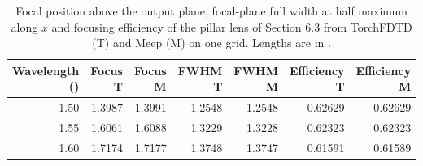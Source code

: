 \begin{table}[tbp]
\centering
\small
\renewcommand{\arraystretch}{1.15}
\caption{Focal position above the output plane, focal-plane full width at half maximum along $x$ and focusing efficiency of the pillar lens of Section 6.3 from TorchFDTD (T) and Meep (M) on one grid. Lengths are in \micron{}.}
\label{tab:si-metalens}
\begin{tabular}{@{}rrrrrrr@{}}
\toprule
\shortstack{Wavelength\\(\micron{})} & Focus T & Focus M & FWHM T & FWHM M & Efficiency T & Efficiency M \\
\midrule
1.50 & 1.3987 & 1.3991 & 1.2548 & 1.2548 & 0.62629 & 0.62629 \\
1.55 & 1.6061 & 1.6088 & 1.3229 & 1.3228 & 0.62323 & 0.62323 \\
1.60 & 1.7174 & 1.7177 & 1.3748 & 1.3747 & 0.61591 & 0.61589 \\
\bottomrule
\end{tabular}
\end{table}
